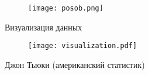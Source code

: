 \documentclass[xcolor=dvipsnames, 12pt]{beamer}
\begin{document}
\begin{frame}{}

\begin{figure}[h!]
\hspace*{-1.05cm}
 \centering
 \texttt{[image: posob.png]}
\end{figure}

\end{frame}  
  
\begin{frame}{Визуализация данных}

\vspace*{-1.2cm}
\begin{figure}[h!]
\hspace*{-1.2cm}
 \centering
 \texttt{[image: visualization.pdf]}
\end{figure}

\vspace*{-1.2cm}
{\footnotesize
{}

\hspace*{4.5cm}Джон Тьюки (американский статистик)
}

\end{frame}  









\end{document}
